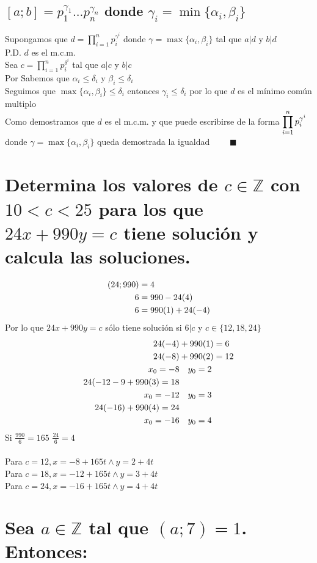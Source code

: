 \documentclass[14pt]{extarticle}
\newcommand{\mysection}[2]{\setcounter{section}{#1}\addtocounter{section}{-1}\section{#2}}
\begin{document}
    \subsection{$[a;b]= p_1^{\gamma_1}...p_n^{\gamma_n}$ donde $\gamma_i = \min\{\alpha_i,\beta_i\}$}
        Supongamos que $d = \displaystyle \prod_{i=1}^{n} p_i^{\gamma^i}$ donde $\gamma = \max\{\alpha_i,\beta_i\}$  tal que $a|d$ y $b|d$ \\
        P.D. $d$  es el m.c.m. \\
        Sea $c = \displaystyle \prod_{i=1}^{n} p_i^{\delta^i}$ tal que $a|c$ y $b|c$ \\
        Por \MakeUppercase{} Sabemos que $\alpha_i\leq\delta_i$ y $\beta_i\leq\delta_i$ \\
        Seguimos que $\max\{\alpha_i,\beta_i\} \leq \delta_i$ entonces $\gamma_i \leq \delta_i$ por lo que $d$ es el mínimo común multiplo \\
        Como demostramos que $d$ es el m.c.m. y que puede escribirse de la forma $\displaystyle \displaystyle \prod_{i=1}^{n} p_i^{\gamma^i}$ donde $\gamma = \max\{\alpha_i,\beta_i\}$ queda demostrada la igualdad $\qquad \blacksquare$
\mysection{13}{Determina los valores de $c \in \mathbb{Z}$ con $10 < c < 25$ para los que $24x + 990y = c$ tiene solución y calcula las soluciones.}
    \begin{align}
        \notag (24;990) &= 4 \\
        \notag 6 &= 990-24(4) \\
        \notag 6 &= 990(1) +24(-4)
    \end{align}
    Por lo que $24x+990y = c$ sólo tiene solución si $6|c$ y $c \in \{12,18,24\}$
    \begin{align}
        \notag 24(-4) &+ 990(1) = 6 \\
        \notag 24(-8) &+ 990(2) = 12 \\
        \notag x_0 = -8 &\quad y_0 = 2 \\
        \notag 24(-12-9+990(3) = 18 \\
        \notag x_0 = -12 &\quad y_0 = 3 \\
        \notag 24(-16) + 990(4) = 24 \\
        \notag x_0 = -16 &\quad y_0 = 4 \\
    \end{align}
    Si $\frac{990}{6} = 165$ \qquad $\frac{24}{6} = 4$ \\ \\
    Para $c = 12, x = -8 + 165t \wedge y =2+4t$ \\
    Para $c = 18, x = -12 + 165t \wedge y =3+4t$ \\
    Para $c = 24, x = -16 + 165t \wedge y =4+4t$ \\
\mysection{20}{Sea $a \in \mathbb{Z}$ tal que $(a;7) = 1$. Entonces:}
\end{document}

